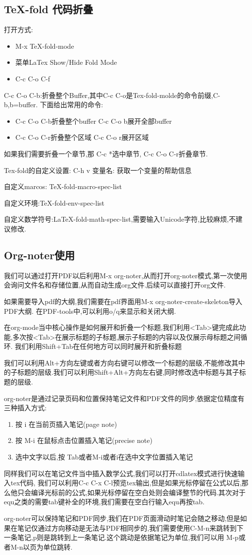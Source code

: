 \documentclass[UTF8]{ctexart}
\begin{document}
\subsection{TeX-fold 代码折叠}
打开方式:
\begin{itemize}
\item M-x TeX-fold-mode 
\item 菜单LaTex Show/Hide Fold Mode 
\item C-c C-o C-f
\end{itemize}
C-c C-o C-b:折叠整个Buffer,其中C-c C-o是Tex-fold-molde的命令前缀,C-b,b=buffer.
下面给出常用的命令:
\begin{itemize}
\item C-c C-o C-b折叠整个buffer C-c C-o b展开全部buffer 
\item  C-c C-o C-r折叠整个区域 C-c C-o r展开区域 
\end{itemize}
如果我们需要折叠一个章节,那 C-c *选中章节, C-c C-o C-r折叠章节.

Tex-fold的自定义设置: C-h v 变量名: 获取一个变量的帮助信息

自定义marcos: TeX-fold-macro-spec-list

自定义环境:TeX-fold-env-spec-list

自定义数学符号:LaTeX-fold-math-spec-list,需要输入Unicode字符,比较麻烦,不建议修改.

\subsection{Org-noter使用}
我们可以通过打开PDF以后利用M-x org-noter,从而打开org-noter模式,第一次使用会询问文件名和存储位置,从而自动生成org文件.后续可以直接打开org文件.

如果需要导入pdf的大纲,我们需要在pdf界面用M-x org-noter-create-skeleton导入PDF大纲. 在PDF-tools中,可以利用o/q来显示和关闭大纲.

在org-mode当中核心操作是如何展开和折叠一个标题,我们利用<Tab>键完成此功能,多次按<Tab>在展示标题的子标题,展示子标题的内容以及仅展示母标题之间循环. 我们利用Shift+Tab在任何地方可以同时展开和折叠标题

我们可以利用Alt+方向左键或者方向右键可以修改一个标题的层级,不能修改其中的子标题的层级.我们可以利用Shift+Alt+方向左右键,同时修改选中标题与其子标题的层级.

org-noter是通过记录页码和位置保持笔记文件和PDF文件的同步,依据定位精度有三种插入方式:
\begin{enumerate}
\item 按 i 在当前页插入笔记(page note)
\item 按 M-i 在鼠标点击位置插入笔记(precise note)
\item 选中文字以后,按 Tab或者M-i或者i在选中文字位置插入笔记
\end{enumerate}

同样我们可以在笔记文件当中插入数学公式,我们可以打开cdlatex模式进行快速输入tex代码, 我们可以利用C-c C-x C-l预览tex输出,但是如果光标停留在公式以后,那么他只会编译光标前的公式,如果光标停留在空白处则会编译整节的代码.其次对于equ之类的需要tab键补全的环境,我们需要在空白行输入equ再按tab.

org-noter可以保持笔记和PDF同步,我们在PDF页面滑动时笔记会随之移动,但是如果在笔记仅通过方向移动是无法与PDF相同步的,我们需要使用C-M-n来跳转到下一条笔记,p则是跳转到上一条笔记.这个跳动是依据笔记为单位,我们可以用 M-p或者M-n以页为单位跳转.
\end{document}
